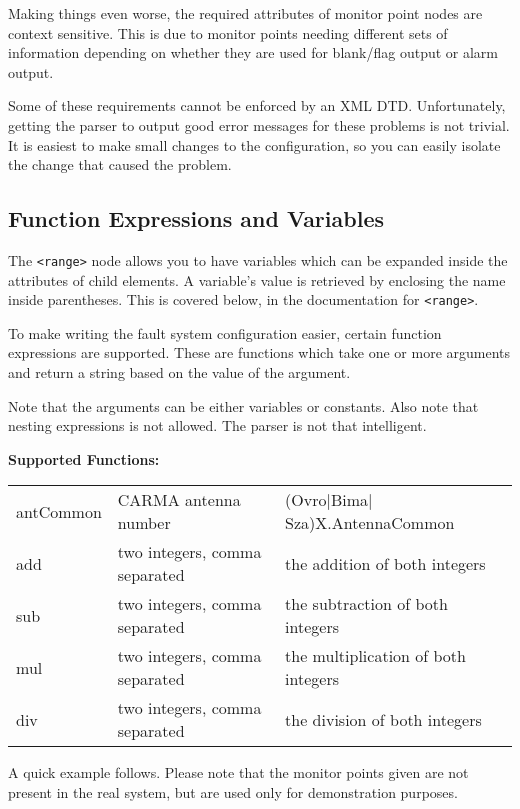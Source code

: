 \documentclass[letterpaper,12pt,oneside,pdftex]{article}
\begin{document}
Making things even worse, the required attributes of monitor point nodes are
context sensitive. This is due to monitor points needing different sets of
information depending on whether they are used for blank/flag output or alarm
output.

Some of these requirements cannot be enforced by an XML DTD. Unfortunately,
getting the parser to output good error messages for these problems is not
trivial. It is easiest to make small changes to the configuration, so you can
easily isolate the change that caused the problem.

\subsection{Function Expressions and Variables}

The \verb|<range>| node allows you to have variables which can be expanded
inside the attributes of child elements. A variable's value is retrieved by
enclosing the name inside parentheses. This is covered below, in the
documentation for \verb|<range>|.

To make writing the fault system configuration easier, certain function
expressions are supported. These are functions which take one or more arguments
and return a string based on the value of the argument.

Note that the arguments can be either variables or constants. Also note that
nesting expressions is not allowed. The parser is not that intelligent.

\textbf{Supported Functions:} \\
\begin{tabular}{lll}
antCommon   & CARMA antenna number          & (Ovro$|$Bima$|$Sza)X.AntennaCommon \\
add         & two integers, comma separated & the addition of both integers \\
sub         & two integers, comma separated & the subtraction of both integers \\
mul         & two integers, comma separated & the multiplication of both integers \\
div         & two integers, comma separated & the division of both integers \\
\end{tabular}

A quick example follows. Please note that the monitor points given are not
present in the real system, but are used only for demonstration purposes.
\end{document}
